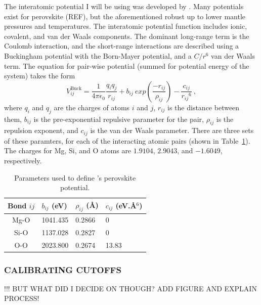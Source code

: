 The interatomic potential I will be using  was developed by \citet{Oganov2000}. Many potentials exist for \mgsios perovskite (REF), but the aforementioned robust up to lower mantle pressures and temperatures. The interatomic potential function includes ionic, covalent, and van der Waals components. The dominant long-range term is the Coulomb interaction, and the short-range interactions are described using a Buckingham potential with the Born-Mayer potential, and a $C/r^{6}$ van der Waals term. The equation for pair-wise potential (summed for potential energy of the system) takes the form
%
\begin{equation}
V_{ij}^{\mathrm{Buck}}
= \frac{1}{4 \pi \epsilon_{0}} 
\frac{q_{i} q_{j}}{r_{ij}} 
+ b_{ij}\ exp\left ( \frac{-r_{ij}}{\rho_{ij}} \right )
- \frac{c_{ij}}{{r_{ij}}^{6}} \  ,
\label{eq.buck}
\end{equation}
%
where $q_{i}$ and $q_{j}$ are the charges of atoms $i$ and $j$, $r_{ij}$ is the distance between them, $b_{ij}$ is the pre-exponential repulsive parameter for the pair, $\rho_{ij}$ is the repulsion exponent, and $c_{ij}$ is the van der Waals parameter.
There are three sets of these paramters, for each of the interacting atomic pairs (shown in Table~\ref{tab.oganov}). The charges for Mg, Si, and O atoms are $1.9104$, $2.9043$, and $-1.6049$, respectively.
%
\begin{table}[h]
\centering
\caption[CONTENTS BIT]{\label{tab.oganov}Parameters used to define \citet{Oganov2000}'s \mgsios perovskite potential.}
\begin{tabular}{clll} 
Bond $ij$ & $b_{ij}$ (eV)  & $\rho_{ij}$ (\AA) & $c_{ij}$ (eV.\AA$^{6}$) \\ \hline
Mg-O        & 1041.435        & 0.2866                 & 0                \\
Si-O          & 1137.028        & 0.2827                 & 0                \\
O-O          & 2023.800        & 0.2674                  & 13.83         \\ \hline       
\end{tabular}
\end{table}

\subsubsection{CALIBRATING CUTOFFS}

!!! BUT WHAT DID I DECIDE ON THOUGH? ADD FIGURE AND EXPLAIN PROCESS!

